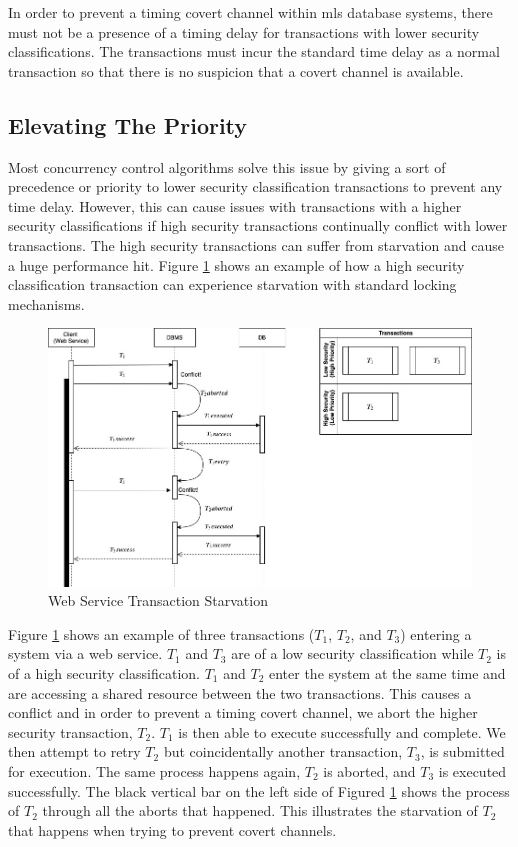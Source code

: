 In order to prevent a timing covert channel within \gls{mls} database systems, there must not be a presence of a timing delay for transactions with lower security classifications. The transactions must incur the standard time delay as a normal transaction so that there is no suspicion that a covert channel is available.

\subsection{Elevating The Priority}
\label{mls:problem_definition_elevation}
Most concurrency control algorithms solve this issue by giving a sort of precedence or priority to lower security classification transactions to prevent any time delay. However, this can cause issues with transactions with a higher security classifications if high security transactions continually conflict with lower transactions. The high security transactions can suffer from starvation and cause a huge performance hit. Figure \ref{fig:ws_trans_starvation} shows an example of how a high security classification transaction can experience starvation with standard locking mechanisms.

\begin{figure}
\centering
\includegraphics[scale=0.45]{images/TransactionStarvation.jpg}
\caption{Web Service Transaction Starvation}
\label{fig:ws_trans_starvation}
\end{figure}

Figure \ref{fig:ws_trans_starvation} shows an example of three transactions ($T_1$, $T_2$, and $T_3$) entering a system via a web service. $T_1$ and $T_3$ are of a low security classification while $T_2$ is of a high security classification. $T_1$ and $T_2$ enter the system at the same time and are accessing a shared resource between the two transactions. This causes a conflict and in order to prevent a timing covert channel, we abort the higher security transaction, $T_2$. $T_1$ is then able to execute successfully and complete. We then attempt to retry $T_2$ but coincidentally another transaction, $T_3$, is submitted for execution. The same process happens again, $T_2$ is aborted, and $T_3$ is executed successfully. The black vertical bar on the left side of Figured \ref{fig:ws_trans_starvation} shows the process of $T_2$ through all the aborts that happened. This illustrates the starvation of $T_2$ that happens when trying to prevent covert channels.

